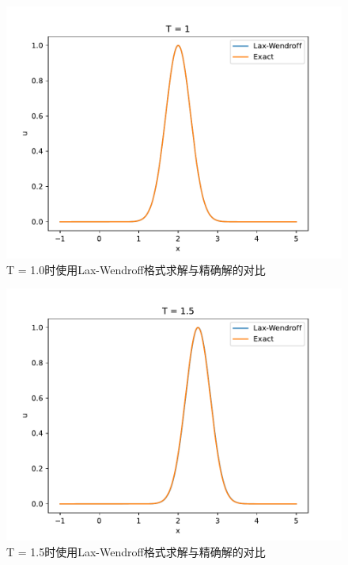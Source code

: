 \documentclass[a4paper,zihao=5,UTF8]{ctexart}
\begin{document}
	\begin{figure}[htbp]
		\centering
		\includegraphics[scale=0.7]{3_3_LW_1_0.pdf}
		\caption{T = 1.0时使用Lax-Wendroff格式求解与精确解的对比}
		\label{3-3-LW-T1.0}
	\end{figure}

	\begin{figure}[htbp]
		\centering
		\includegraphics[scale=0.7]{3_3_LW_1_5.pdf}
		\caption{T = 1.5时使用Lax-Wendroff格式求解与精确解的对比}
		\label{3-3-LW-T1.5}
	\end{figure}
\end{document}
